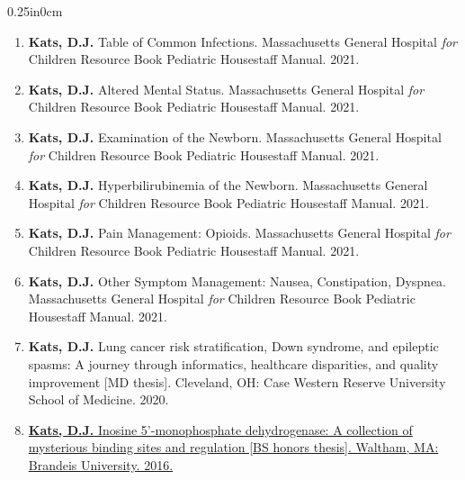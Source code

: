 \documentclass[11pt]{article}
\newcommand{\blockindent}{0.25in}
\begin{document}
\begin{adjustwidth}{\blockindent}{0cm}
\begin{enumerate}[resume]
		\item\label{rainbow-common-infections} \textbf{Kats, D.J.} Table of Common Infections. Massachusetts General Hospital \textit{for} Children Resource Book Pediatric Housestaff Manual. 2021.

		\item\label{rainbow-ams} \textbf{Kats, D.J.} Altered Mental Status. Massachusetts General Hospital \textit{for} Children Resource Book Pediatric Housestaff Manual. 2021.

		\item\label{rainbow-newborn-exam} \textbf{Kats, D.J.} Examination of the Newborn. Massachusetts General Hospital \textit{for} Children Resource Book Pediatric Housestaff Manual. 2021.

		\item\label{rainbow-newborn-exam} \textbf{Kats, D.J.} Hyperbilirubinemia of the Newborn. Massachusetts General Hospital \textit{for} Children Resource Book Pediatric Housestaff Manual. 2021.

		\item\label{rainbow-newborn-exam} \textbf{Kats, D.J.} Pain Management: Opioids. Massachusetts General Hospital \textit{for} Children Resource Book Pediatric Housestaff Manual. 2021.

		\item\label{rainbow-newborn-exam} \textbf{Kats, D.J.} Other Symptom Management: Nausea, Constipation, Dyspnea. Massachusetts General Hospital \textit{for} Children Resource Book Pediatric Housestaff Manual. 2021.

		\item\label{mdthesis} \textbf{Kats, D.J.} Lung cancer risk stratification, Down syndrome, and epileptic spasms: A journey through informatics, healthcare disparities, and quality improvement [MD thesis]. Cleveland, OH: Case Western Reserve University School of Medicine. 2020.

		\item\label{bsthesis} \href{http://hdl.handle.net/10192/32359}{\textbf{Kats, D.J.} Inosine 5'-monophosphate dehydrogenase: A collection of mysterious binding sites and regulation [BS honors thesis]. Waltham, MA: Brandeis University. 2016.}

	\end{enumerate}

\end{adjustwidth}

\end{document}

